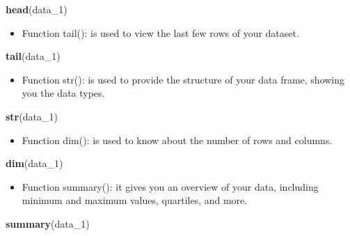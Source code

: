 \documentclass[
]{book}
\newenvironment{Shaded}{\begin{snugshade}}{\end{snugshade}}
\newcommand{\FunctionTok}[1]{\textcolor[rgb]{0.13,0.29,0.53}{\textbf{#1}}}
\newcommand{\NormalTok}[1]{#1}
\providecommand{\tightlist}{%
  \setlength{\itemsep}{0pt}\setlength{\parskip}{0pt}}
\begin{document}
\begin{Shaded}
\begin{Highlighting}[]
\FunctionTok{head}\NormalTok{(data\_1)}
\end{Highlighting}
\end{Shaded}

\begin{itemize}
\tightlist
\item
  Function tail(): is used to view the last few rows of your dataset.
\end{itemize}

\begin{Shaded}
\begin{Highlighting}[]
\FunctionTok{tail}\NormalTok{(data\_1)}
\end{Highlighting}
\end{Shaded}

\begin{itemize}
\tightlist
\item
  Function str(): is used to provide the structure of your data frame, showing you the data types.
\end{itemize}

\begin{Shaded}
\begin{Highlighting}[]
\FunctionTok{str}\NormalTok{(data\_1)}
\end{Highlighting}
\end{Shaded}

\begin{itemize}
\tightlist
\item
  Function dim(): is used to know about the number of rows and columns.
\end{itemize}

\begin{Shaded}
\begin{Highlighting}[]
\FunctionTok{dim}\NormalTok{(data\_1)}
\end{Highlighting}
\end{Shaded}

\begin{itemize}
\tightlist
\item
  Function summary(): it gives you an overview of your data, including minimum and maximum values, quartiles, and more.
\end{itemize}

\begin{Shaded}
\begin{Highlighting}[]
\FunctionTok{summary}\NormalTok{(data\_1)}
\end{Highlighting}
\end{Shaded}
\end{document}
